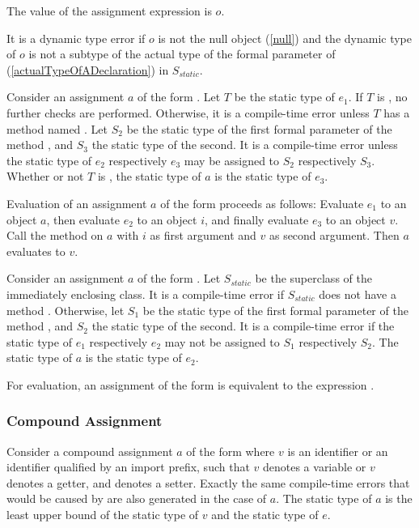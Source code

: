 \documentclass[makeidx]{article}
\begin{document}
\LMHash{}%
The value of the assignment expression is $o$.

\LMHash{}%
It is a dynamic type error if $o$ is not the null object (\ref{null})
and the dynamic type of $o$ is
not a subtype of the actual type of the formal parameter of 
(\ref{actualTypeOfADeclaration}) in $S_{static}$.

\LMHash{}%
Consider an assignment $a$ of the form .
Let $T$ be the static type of $e_1$.
If $T$ is \DYNAMIC{}, no further checks are performed.
Otherwise, it is a compile-time error unless
$T$ has a method named \code{[]=}.
Let $S_2$ be the static type of the
first formal parameter of the method \code{[]=},
and $S_3$ the static type of the second.
It is a compile-time error unless the static type of $e_2$ respectively $e_3$
may be assigned to $S_2$ respectively $S_3$.
Whether or not $T$ is \DYNAMIC{},
the static type of $a$ is the static type of $e_3$.

\LMHash{}%
Evaluation of an assignment $a$ of the form 
proceeds as follows:
Evaluate $e_1$ to an object $a$, then evaluate $e_2$ to an object $i$, and finally evaluate $e_3$ to an object $v$.
Call the method \code{[]=} on $a$ with $i$ as first argument and $v$ as second argument.
Then $a$ evaluates to $v$.

\LMHash{}%
Consider an assignment $a$ of the form .
Let $S_{static}$ be the superclass of the immediately enclosing class.
It is a compile-time error if $S_{static}$ does not have a method \code{[]=}.
Otherwise, let $S_1$ be the static type of the
first formal parameter of the method \code{[]=},
and $S_2$ the static type of the second.
It is a compile-time error if the static type of $e_1$ respectively $e_2$
may not be assigned to $S_1$ respectively $S_2$.
The static type of $a$ is the static type of $e_2$.

\LMHash{}%
For evaluation, an assignment of the form 
is equivalent to the expression .


\subsubsection{Compound Assignment}

\LMHash{}%
Consider a compound assignment $a$ of the form 
where $v$ is an identifier or an identifier qualified by an import prefix,
such that $v$ denotes a variable or $v$ denotes a getter, and  denotes a setter.
Exactly the same compile-time errors that would be caused by  are also generated in the case of $a$.
The static type of $a$ is the least upper bound of the static type of $v$ and the static type of $e$.
\end{document}
